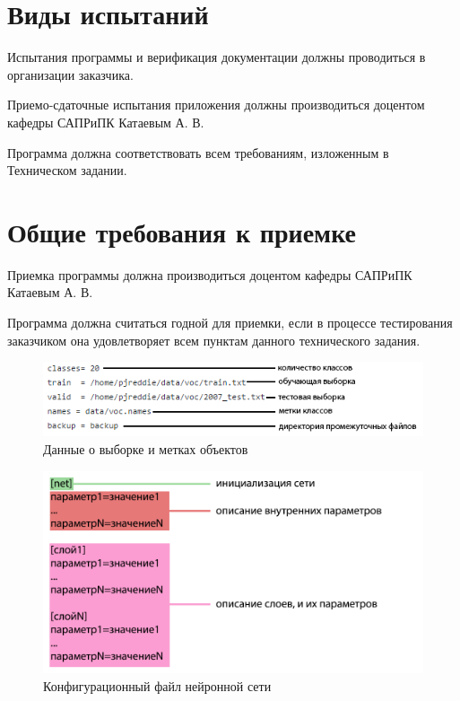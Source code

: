 \documentclass[a4paper,english]{G2-105}
\begin{document}
\section{Виды испытаний}
\par Испытания программы и верификация документации должны проводиться в организации заказчика.
\par Приемо-сдаточные испытания приложения должны производиться доцентом кафедры САПРиПК Катаевым А. В. 
\par Программа должна соответствовать всем требованиям, изложенным в Техническом задании.
\section{Общие требования к приемке}
\par Приемка программы должна производиться доцентом кафедры
САПРиПК Катаевым А. В.
\par Программа должна считаться годной для приемки, если в процессе
тестирования заказчиком она удовлетворяет всем пунктам данного
технического задания.

\begin{figure} 
\includegraphics[width = \linewidth]{metki.png}
\caption{Данные о выборке и метках объектов}\label{met}
\end{figure}
\begin{figure} 
\includegraphics[width = \linewidth]{network_cfg.png}
\caption{Конфигурационный файл нейронной сети}\label{network_cfg}
\end{figure}
\end{document}
